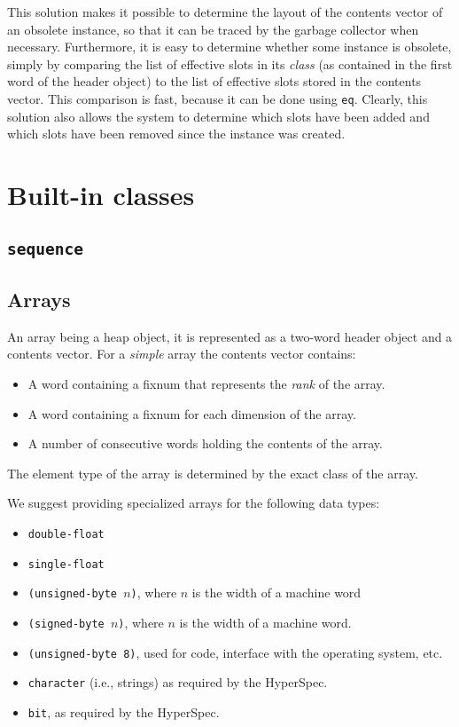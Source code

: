 This solution makes it possible to determine the layout of the
contents vector of an obsolete instance, so that it can be traced by
the garbage collector when necessary.  Furthermore, it is easy to
determine whether some instance is obsolete, simply by comparing the
list of effective slots in its \emph{class} (as contained in the first
word of the header object) to the list of effective slots stored in
the contents vector.  This comparison is fast, because it can be done
using \texttt{eq}.  Clearly, this solution also allows the system to
determine which slots have been added and which slots have been
removed since the instance was created. 

\section{Built-in classes}

\subsection{\texttt{sequence}}

\subsection{Arrays}

An array being a heap object, it is represented as a two-word header
object and a contents vector.  For a \emph{simple} array the contents
vector contains:

\begin{itemize}
\item A word containing a fixnum that represents the \emph{rank} of
  the array.
\item A word containing a fixnum for each dimension of the array.
\item A number of consecutive words holding the contents of the
  array. 
\end{itemize}

The element type of the array is determined by the exact class of the
array. 

We suggest providing specialized arrays for the following data types:

\begin{itemize}
\item \texttt{double-float}
\item \texttt{single-float}
\item \texttt{(unsigned-byte $n$)}, where $n$ is the width of a
  machine word
\item \texttt{(signed-byte $n$)}, where $n$ is the width of a
  machine word.
\item \texttt{(unsigned-byte 8)}, used for code, interface with the
  operating system, etc. 
\item \texttt{character} (i.e., strings) as required by the HyperSpec.
\item \texttt{bit}, as required by the HyperSpec.
\end{itemize}

